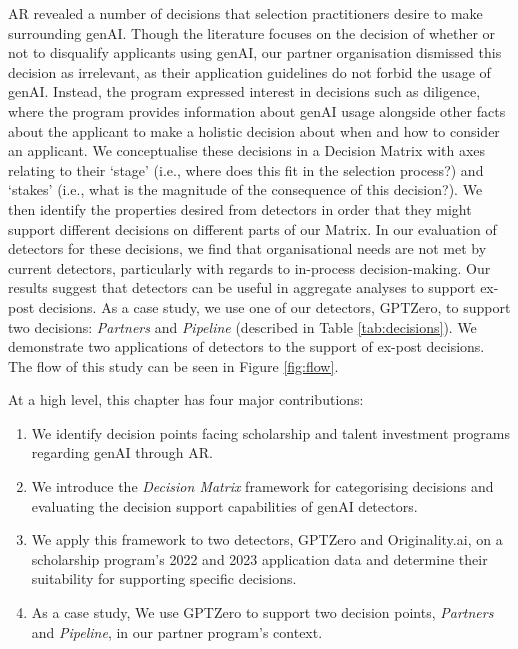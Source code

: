 AR revealed a number of decisions that selection practitioners desire to make surrounding genAI. Though the literature focuses on the decision of whether or not to disqualify applicants using genAI, our partner organisation dismissed this decision as irrelevant, as their application guidelines do not forbid the usage of genAI. Instead, the program expressed interest in decisions such as diligence, where the program provides information about genAI usage alongside other facts about the applicant to make a holistic decision about when and how to consider an applicant. We conceptualise these decisions in a Decision Matrix with axes relating to their `stage' (i.e., where does this fit in the selection process?) and `stakes' (i.e., what is the magnitude of the consequence of this decision?). We then identify the properties desired from detectors in order that they might support different decisions on different parts of our Matrix. In our evaluation of detectors for these decisions, we find that organisational needs are not met by current detectors, particularly with regards to in-process decision-making. Our results suggest that detectors can be useful in aggregate analyses to support ex-post decisions. As a case study, we use one of our detectors, GPTZero, to support two decisions: \emph{Partners} and \emph{Pipeline} (described in Table \ref{tab:decisions}). We demonstrate two applications of detectors to the support of ex-post decisions. The flow of this study can be seen in Figure \ref{fig:flow}.

At a high level, this chapter has four major contributions:

\begin{enumerate}
    \item We identify decision points facing scholarship and talent investment programs regarding genAI through AR.
    \item We introduce the \emph{Decision Matrix} framework for categorising decisions and evaluating the decision support capabilities of genAI detectors.
    \item We apply this framework to two detectors, GPTZero and Originality.ai, on a scholarship program's 2022 and 2023 application data and determine their suitability for supporting specific decisions.
    \item As a case study, We use GPTZero to support two decision points, \emph{Partners} and \emph{Pipeline}, in our partner program's context.
\end{enumerate}

